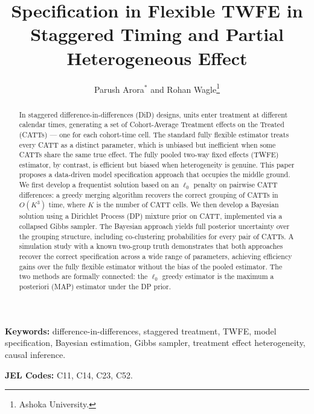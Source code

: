 \documentclass[margin=3in, 12pt]{article}
\title{\textbf{Specification in Flexible TWFE in Staggered
       Timing and Partial Heterogeneous Effect}%
       }
\author{Parush Arora$^*$ and Rohan Wagle\thanks{Ashoka University.}}
\date{}
\newcommand{\1}{\mathbbm{1}}
\begin{document}
\maketitle

\begin{abstract}
  \noindent
  In staggered difference-in-differences (DiD) designs, units enter treatment at
  different calendar times, generating a set of Cohort-Average Treatment effects
  on the Treated (CATTs) --- one for each cohort-time cell. The standard
  fully flexible estimator treats every CATT as a distinct parameter, which is
  unbiased but inefficient when some CATTs share the same true effect.
  The fully pooled two-way fixed effects (TWFE) estimator, by contrast, is
  efficient but biased when heterogeneity is genuine.
  This paper proposes a data-driven model specification approach that occupies
  the middle ground. We first develop a frequentist solution based on an $\ell_0$ penalty on pairwise CATT differences: a greedy merging algorithm recovers the correct grouping of CATTs in $O(K^3)$ time, where $K$ is the number of CATT cells. We then develop a Bayesian solution using a Dirichlet Process (DP) mixture prior on CATT, implemented via a collapsed Gibbs sampler. The Bayesian approach yields full posterior uncertainty over the grouping structure, including co-clustering probabilities for every pair of CATTs. A simulation study with a known two-group truth demonstrates that both approaches recover the correct specification across a wide range of parameters, achieving efficiency gains over the fully flexible estimator without the bias of the pooled estimator. The two methods are formally connected: the $\ell_0$ greedy estimator is the maximum a posteriori (MAP) estimator under the DP prior.
\end{abstract}

\bigskip
\noindent\textbf{Keywords:} difference-in-differences, staggered treatment, TWFE, model specification, Bayesian estimation, Gibbs sampler,
treatment effect heterogeneity, causal inference.

\bigskip
\noindent\textbf{JEL Codes:} C11, C14, C23, C52.

\newpage

\end{document}
